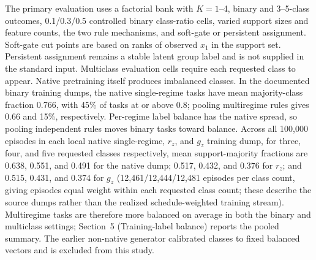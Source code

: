 \documentclass{article}
\begin{document}
The primary evaluation uses a factorial bank with $K=1$--4, binary and 3--5-class outcomes, 0.1/0.3/0.5 controlled binary class-ratio cells, varied support sizes and feature counts, the two rule mechanisms, and soft-gate or persistent assignment. Soft-gate cut points are based on ranks of observed $x_1$ in the support set. Persistent assignment remains a stable latent group label and is not supplied in the standard input. Multiclass evaluation cells require each requested class to appear. Native pretraining itself produces imbalanced classes. In the documented binary training dumps, the native single-regime tasks have mean majority-class fraction 0.766, with 45\% of tasks at or above 0.8; pooling multiregime rules gives 0.66 and 15\%, respectively. Per-regime label balance has the native spread, so pooling independent rules moves binary tasks toward balance. Across all 100,000 episodes in each local native single-regime, $r_z$, and $g_z$ training dump, for three, four, and five requested classes respectively, mean support-majority fractions are 0.638, 0.551, and 0.491 for the native dump; 0.517, 0.432, and 0.376 for $r_z$; and 0.515, 0.431, and 0.374 for $g_z$ (12,461/12,444/12,481 episodes per class count, giving episodes equal weight within each requested class count; these describe the source dumps rather than the realized schedule-weighted training stream). Multiregime tasks are therefore more balanced on average in both the binary and multiclass settings; Section~5 (Training-label balance) reports the pooled summary. The earlier non-native generator calibrated classes to fixed balanced vectors and is excluded from this study.
\end{document}
